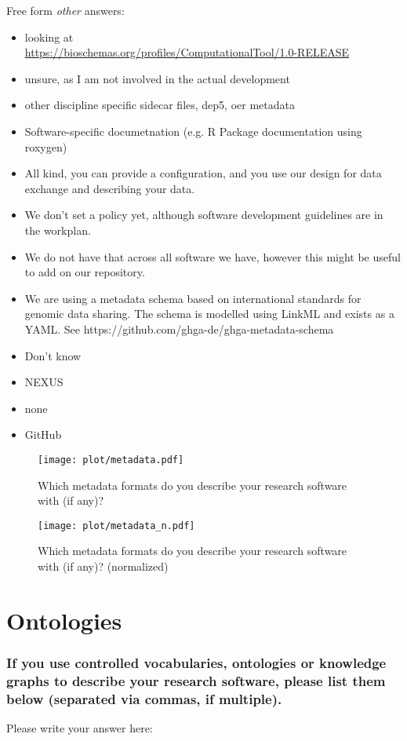 \documentclass[headsepline,titlepage,twoside,12pt,toc=flat,headings=normal]{scrreprt}
\newcommand{\question}[1]{\subsubsection{#1}}
\newcommand{\otherbox}{\fbox{\phantom{This is how big an answer would be.}}}
\begin{document}
\vspace{0.1em}
Free form \emph{other} answers:
\begin{itemize}
\item looking at\\\url{https://bioschemas.org/profiles/ComputationalTool/1.0-RELEASE}
\item unsure, as I am not involved in the actual development
\item other discipline specific sidecar files, dep5, oer metadata
\item Software-specific documetnation (e.g. R Package documentation using roxygen)
\item All kind, you can provide a configuration, and you use our design for data exchange and describing your data.
\item We don't set a policy yet, although software development guidelines are in the workplan.
\item We do not have that across all software we have, however this might be useful to add on our repository.
\item We are using a metadata schema based on international standards for genomic data sharing. The schema is modelled using LinkML and exists as a YAML. See https://github.com/ghga-de/ghga-metadata-schema
\item Don't know
\item NEXUS
\item none
\item GitHub
\end{itemize}

\begin{figure}[h!]
\caption[Metadata formats]{Which metadata formats do you describe your research software with (if any)?}
\label{fig:metadata}
\texttt{[image: plot/metadata.pdf]}
\end{figure}

\begin{figure}[h!]
\caption[Metadata formats (normalized)]{Which metadata formats do you describe your research software with (if any)? (normalized)}
\label{fig:metadata_n}
\texttt{[image: plot/metadata\_n.pdf]}
\end{figure}

\clearpage
\section{Ontologies}
\question{If you use controlled vocabularies, ontologies or knowledge graphs to describe your research software, please list them below (separated via commas, if multiple).}
Please write your answer here: \otherbox
\end{document}
